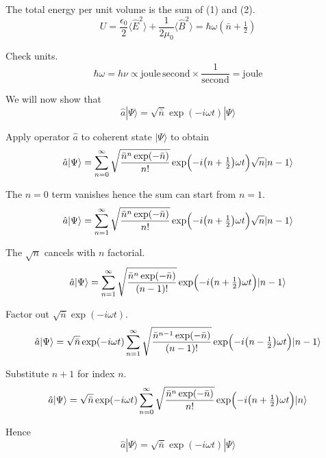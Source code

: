 \documentclass[12pt]{article}
\begin{document}
The total energy per unit volume is the sum of (1) and (2).
\begin{equation*}
U=\frac{\epsilon_0}{2}\langle\hat E^2\rangle
+\frac{1}{2\mu_0}\langle\hat B^2\rangle
=\hbar\omega\left(\bar n+\tfrac{1}{2}\right)
\end{equation*}

Check units.
\begin{equation*}
\hbar\omega=h\nu\propto\text{joule}\,\text{second}\times\frac{1}{\text{second}}=\text{joule}
\end{equation*}

We will now show that
\begin{equation*}
\hat a|\Psi\rangle=\sqrt{\bar n}\exp(-i\omega t)|\Psi\rangle
\end{equation*}

Apply operator $\hat a$ to coherent state $|\Psi\rangle$ to obtain
\begin{equation*}
\hat a|\Psi\rangle
=\sum_{n=0}^\infty
\sqrt{\frac{\bar n^n\exp(-\bar n)}{n!}}
\exp\Bigl(-i\bigl(n+\tfrac{1}{2}\bigr)\omega t\Bigr)
\sqrt n|n-1\rangle
\end{equation*}

The $n=0$ term vanishes hence the sum can start from $n=1$.
\begin{equation*}
\hat a|\Psi\rangle
=\sum_{n=1}^\infty
\sqrt{\frac{\bar n^n\exp(-\bar n)}{n!}}
\exp\Bigl(-i\bigl(n+\tfrac{1}{2}\bigr)\omega t\Bigr)
\sqrt n|n-1\rangle
\end{equation*}

The $\sqrt n$ cancels with $n$ factorial.
\begin{equation*}
\hat a|\Psi\rangle
=\sum_{n=1}^\infty
\sqrt{\frac{\bar n^n\exp(-\bar n)}{(n-1)!}}
\exp\Bigl(-i\bigl(n+\tfrac{1}{2}\bigr)\omega t\Bigr)
|n-1\rangle
\end{equation*}

Factor out $\sqrt{\bar n}\exp(-i\omega t)$.
\begin{equation*}
\hat a|\Psi\rangle
=\sqrt{\bar n}\exp(-i\omega t)
\sum_{n=1}^\infty
\sqrt{\frac{\bar n^{n-1}\exp(-\bar n)}{(n-1)!}}
\exp\Bigl(-i\bigl(n-\tfrac{1}{2}\bigr)\omega t\Bigr)
|n-1\rangle
\end{equation*}

Substitute $n+1$ for index $n$.
\begin{equation*}
\hat a|\Psi\rangle
=\sqrt{\bar n}\exp(-i\omega t)
\sum_{n=0}^\infty
\sqrt{\frac{\bar n^n\exp(-\bar n)}{n!}}
\exp\Bigl(-i\bigl(n+\tfrac{1}{2}\bigr)\omega t\Bigr)
|n\rangle
\end{equation*}

Hence
\begin{equation*}
\hat a|\Psi\rangle=\sqrt{\bar n}\exp(-i\omega t)|\Psi\rangle
\end{equation*}
\end{document}
